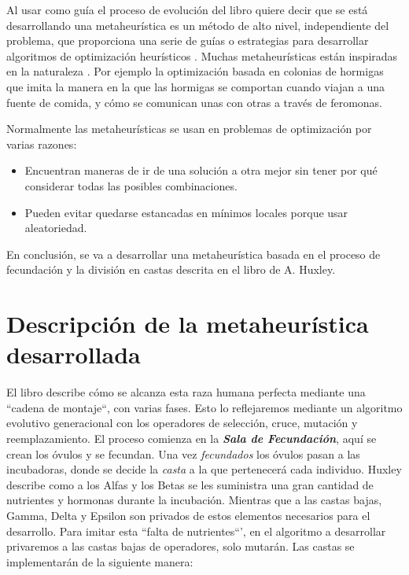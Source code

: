 Al usar como guía el proceso de evolución del libro quiere decir que se está desarrollando una metaheurística es un 
método de alto nivel, independiente del problema, que proporciona una serie de guías o 
estrategias para desarrollar algoritmos de optimización heurísticos \cite{metaheuristics_def}. Muchas metaheurísticas
están inspiradas en la naturaleza \cite{Molina2020ComprehensiveTO}. Por ejemplo la optimización basada en colonias de
hormigas que imita la manera en la que las hormigas se comportan cuando viajan a una fuente de comida, y cómo se 
comunican unas con otras a través de feromonas. 

Normalmente las metaheurísticas se usan en problemas de optimización por varias razones:
\begin{itemize}
    \item Encuentran maneras de ir de una solución a otra mejor sin tener por qué considerar todas las posibles combinaciones. 
    \item Pueden evitar quedarse estancadas en mínimos locales porque usar aleatoriedad.
\end{itemize}

En conclusión, se va a desarrollar una metaheurística basada en el proceso de fecundación y la división en castas descrita en el libro de A. Huxley.

\section{Descripción de la metaheurística desarrollada}

El libro describe cómo se alcanza esta raza humana perfecta mediante una ``cadena de montaje``, con varias fases. Esto lo reflejaremos mediante 
un algoritmo evolutivo generacional con los operadores de selección, cruce, mutación y reemplazamiento. El proceso comienza en la \textbf{\textit{Sala de Fecundación}}, 
aquí se crean los óvulos y se fecundan. Una vez \textit{fecundados} los óvulos pasan a las incubadoras, donde se decide la \textit{casta} a la que pertenecerá cada individuo. Huxley
describe como a los Alfas y los Betas se les suministra una gran cantidad de nutrientes y hormonas durante la incubación. Mientras que a las castas bajas, Gamma, Delta y
Epsilon son privados de estos elementos necesarios para el desarrollo. Para imitar esta ``falta de nutrientes``', en el algoritmo a desarrollar privaremos a las castas bajas de
operadores, solo mutarán. Las castas se implementarán de la siguiente manera: 

